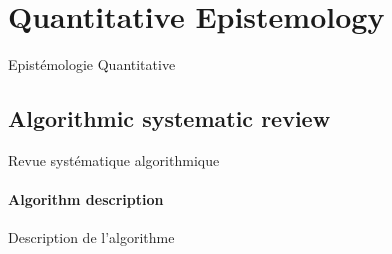 






\section{Quantitative Epistemology}{Epistémologie Quantitative}

\label{app:sec:quantepistemo}



\subsection{Algorithmic systematic review}{Revue systématique algorithmique}



\paragraph{Algorithm description}{Description de l'algorithme}



